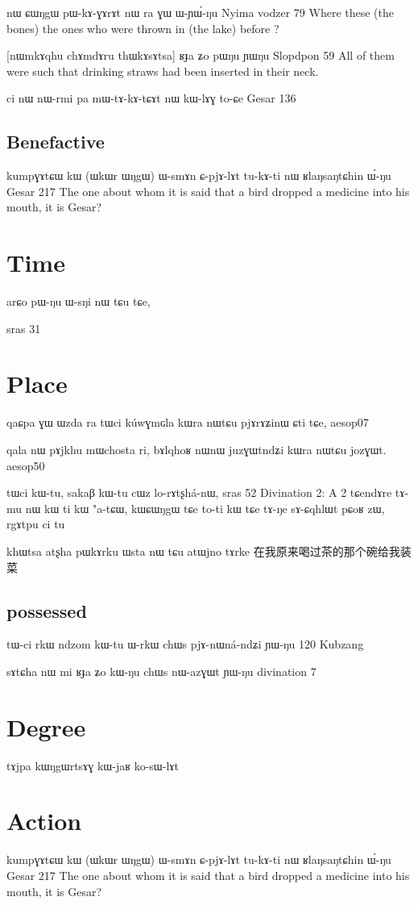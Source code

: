 \documentclass[oldfontcommands,oneside,a4paper,11pt]{memoir}
\newcommand{\wav}[1]{}%
\begin{document}
 nɯ	ɕɯŋgɯ	pɯ-kɤ-ɣɤrɤt	nɯ	ra	ɣɯ	ɯ-ɲɯ́-ŋu
 Nyima vodzer 79
Where these (the bones) the ones who were thrown in (the lake) before ?
 
 [nɯmkɤqhu chɤmdɤru thɯkɤsɤtsa] ʁɟa ʑo pɯŋu ɲɯŋu 
 Slopdpon 59
All of them were such that drinking straws had been inserted in their neck.
 
 ci	nɯ	nɯ-rmi	pa	mɯ-tɤ-kɤ-tɕɤt	nɯ	kɯ-lɤɣ	to-ɕe	
 Gesar 136
\subsection{Benefactive}
kumpɣɤtɕɯ	kɯ	(ɯkɯr ɯŋgɯ) ɯ-smɤn	ɕ-pjɤ-lɤt	tu-kɤ-ti nɯ	ʁlaŋsaŋtɕhin	ɯ́-ŋu
Gesar 217
The one about whom it is said that a bird dropped a medicine into his mouth, it is Gesar?

\section{Time}
arɕo pɯ-ŋu ɯ-sŋi nɯ tɕu tɕe,

sras 31


\section{Place}
qaɕpa ɣɯ ɯzda ra tɯci kúwɣmɢla kɯra nɯtɕu pjɤrɤʑinɯ ɕti tɕe, aesop07

qala nɯ pɤjkhu mɯchosta ri, bɤlqhoʁ nɯnɯ juzɣɯtndʑi kɯra nɯtɕu jozɣɯt. aesop50

tɯci kɯ-tu, sakaβ kɯ-tu cɯz lo-rɤtʂhá-nɯ,
sras 52
Divination 2:
A	2	tɕendɤre tɤ-mu nɯ kɯ ti kɯ "a-tɕɯ, kɯɕɯŋgɯ tɕe to-ti kɯ tɕe  tɤ-ŋe sɤ-ɕqhlɯt pɕoʁ zɯ, rgɤtpu ci tu


 khɯtsa atʂha pɯkɤrku ɯsta nɯ tɕu atɯjno tɤrke
 在我原来喝过茶的那个碗给我装菜
\wav{8_Wsta}
\subsection{possessed}
tɯ-ci	rkɯ	ndzom	kɯ-tu	ɯ-rkɯ	chɯs	pjɤ-nɯná-ndʑi	ɲɯ-ŋu
120 Kubzang

sɤtɕha nɯ mi ʁɟa ʑo kɯ-ŋu chɯs nɯ-azɣɯt ɲɯ-ŋu
divination 7



\section{Degree}
tɤjpa kɯŋgɯrtsɤɣ kɯ-jaʁ ko-sɯ-lɤt

\section{Action}
kumpɣɤtɕɯ	kɯ	(ɯkɯr ɯŋgɯ) ɯ-smɤn	ɕ-pjɤ-lɤt	tu-kɤ-ti nɯ	ʁlaŋsaŋtɕhin	ɯ́-ŋu
Gesar 217
The one about whom it is said that a bird dropped a medicine into his mouth, it is Gesar?
\end{document}
